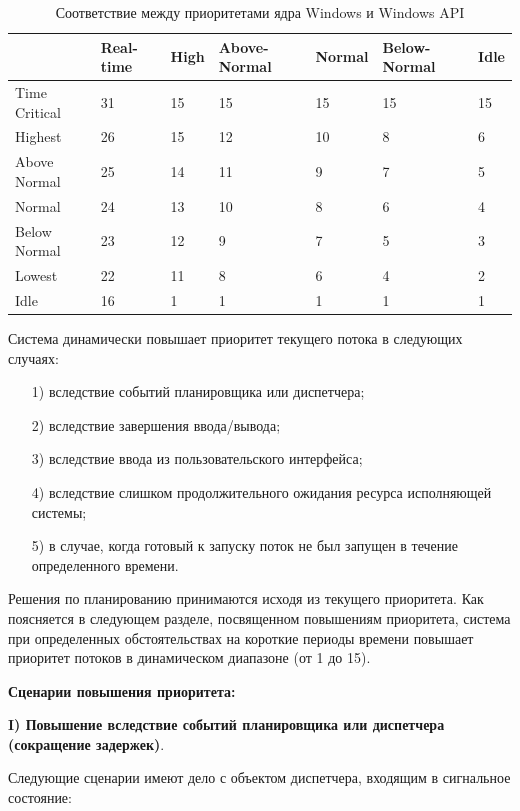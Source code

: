\documentclass[14pt, a4paper]{extarticle}
\begin{document}
	 \begin{table}
	 	\begin{center}
	 		\begin{tabular}{|l|p{45pt}|p{45pt}|p{45pt}|p{45pt}|p{45pt}|p{45pt}|}
	 			\hline
	 			{} & Real-time & High & Above-Normal & Normal & Below-Normal & Idle\\
	 			\hline
	 			Time Critical & 31 & 15 & 15 & 15 & 15 & 15 \\
	 			\hline
	 			Highest & 26 & 15 & 12 & 10 & 8 & 6 \\
	 			\hline
	 			Above Normal & 25 & 14 & 11 & 9 & 7 & 5 \\
	 			\hline
	 			Normal & 24 & 13 & 10 & 8 & 6 & 4 \\
	 			\hline
	 			Below Normal & 23 & 12 & 9 & 7 & 5 & 3 \\
	 			\hline
	 			Lowest & 22 & 11 & 8 & 6 & 4 & 2 \\
	 			\hline
	 			Idle & 16 & 1 & 1 & 1 & 1 & 1 \\
	 			\hline
	 		\end{tabular}
	 	\end{center}
	 	\caption*{Соответствие между приоритетами ядра Windows и Windows API}
	 	\label{tbl:priority}
	 \end{table}
	\newpage
	Система динамически повышает приоритет текущего потока в следующих случаях:
	\begin{itemize}
		\item[1)] вследствие событий планировщика или диспетчера;
		\item[2)] вследствие завершения ввода/вывода;
		\item[3)] вследствие ввода из пользовательского интерфейса;
		\item[4)] вследствие слишком продолжительного ожидания ресурса исполняющей системы;
		\item[5)] в случае, когда готовый к запуску поток не был запущен в течение определенного времени.
	\end{itemize}\par
		
	Решения по планированию принимаются исходя из текущего приоритета. Как поясняется в следующем разделе, посвященном повышениям приоритета, система при
	определенных обстоятельствах на короткие периоды времени повышает приоритет
	потоков в динамическом диапазоне (от 1 до 15). \par	
	
	\clearpage		
	\textbf{Сценарии повышения приоритета:}\par
	\textbf{I) Повышение вследствие событий планировщика или диспетчера (сокращение задержек)}.\par
	Следующие сценарии имеют дело с объектом диспетчера, входящим в сигнальное
	состояние: 
	
\end{document}
